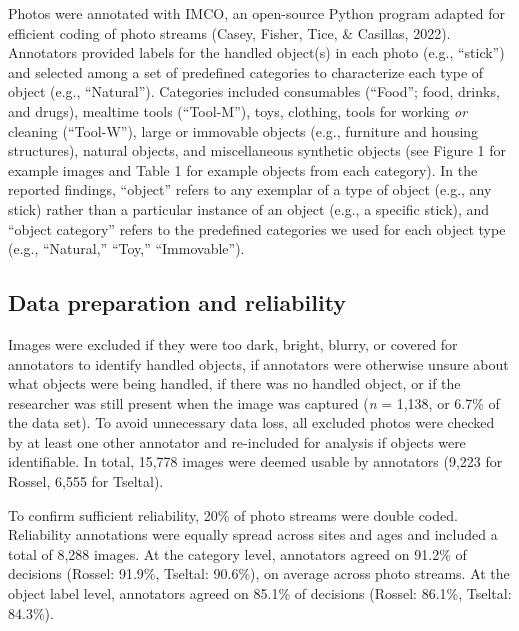 \documentclass[10pt, letterpaper]{article}
\begin{document}
Photos were annotated with IMCO, an open-source Python program adapted
for efficient coding of photo streams (Casey, Fisher, Tice, \& Casillas,
2022). Annotators provided labels for the handled object(s) in each
photo (e.g., ``stick'') and selected among a set of predefined
categories to characterize each type of object (e.g., ``Natural'').
Categories included consumables (``Food''; food, drinks, and drugs),
mealtime tools (``Tool-M''), toys, clothing, tools for working \emph{or}
cleaning (``Tool-W''), large or immovable objects (e.g., furniture and
housing structures), natural objects, and miscellaneous synthetic
objects (see Figure 1 for example images and Table 1 for example objects
from each category). In the reported findings, ``object'' refers to any
exemplar of a type of object (e.g., any stick) rather than a particular
instance of an object (e.g., a specific stick), and ``object category''
refers to the predefined categories we used for each object type (e.g.,
``Natural,'' ``Toy,'' ``Immovable'').

\hypertarget{data-preparation-and-reliability}{%
\subsection{Data preparation and
reliability}\label{data-preparation-and-reliability}}

Images were excluded if they were too dark, bright, blurry, or covered
for annotators to identify handled objects, if annotators were otherwise
unsure about what objects were being handled, if there was no handled
object, or if the researcher was still present when the image was
captured (\emph{n} = 1,138, or 6.7\% of the data set). To avoid
unnecessary data loss, all excluded photos were checked by at least one
other annotator and re-included for analysis if objects were
identifiable. In total, 15,778 images were deemed usable by annotators
(9,223 for Rossel, 6,555 for Tseltal).

To confirm sufficient reliability, 20\% of photo streams were double
coded. Reliability annotations were equally spread across sites and ages
and included a total of 8,288 images. At the category level, annotators
agreed on 91.2\% of decisions (Rossel: 91.9\%, Tseltal: 90.6\%), on
average across photo streams. At the object label level, annotators
agreed on 85.1\% of decisions (Rossel: 86.1\%, Tseltal: 84.3\%).
\end{document}
